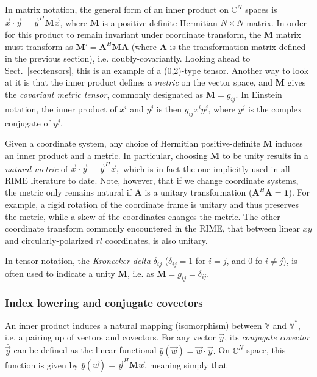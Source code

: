 \documentclass[]{aa}
\newcommand{\herm}{H}
\begin{document}
In matrix notation, the general form of an inner product on $\mathbb{C}^N$ spaces is $\vec x\cdot \vec y = \vec y^\herm \mathbf{M} \vec x$, where $\mathbf{M}$ is a positive-definite Hermitian $N\times N$ matrix. In order for this product to remain invariant under coordinate transform, the $\mathbf{M}$ matrix must transform as $\mathbf{M}'=\mathbf{A}^\herm \mathbf{M} \mathbf{A}$ (where $\mathbf{A}$ is the transformation matrix defined in the previous section), i.e. doubly-covariantly. Looking ahead to Sect.~\ref{sec:tensors}, this is an example of a (0,2)-type tensor. Another way to look at it is that the inner product defines a \emph{metric} on the vector space, and $\mathbf{M}$ gives the \emph{covariant metric tensor}, commonly designated as $\mathbf{M}=g_{ij}$. In Einstein notation, the inner product of $x^i$ and $y^j$ is then $g_{ij} x^i \overline{y^j}$, where $\overline{y^j}$ is the complex conjugate of $y^j$.

Given a coordinate system, any choice of Hermitian positive-definite $\mathbf{M}$ induces an inner product and a metric. In particular, choosing 
$\mathbf{M}$ to be unity results in a \emph{natural metric} of $\vec x \cdot \vec y=\vec y^\herm\vec x,$ which is in fact the one implicitly used in all RIME literature to date. Note, however, that if we change coordinate systems, the metric only remains natural if $\mathbf{A}$ is a unitary transformation ($\mathbf{A}^\herm \mathbf{A}=\mathbf{1}$). For example, a rigid rotation of the coordinate frame is unitary and thus preserves the metric, while a skew of the coordinates changes the metric. The other coordinate transform commonly encountered in the RIME, that between linear $xy$ and circularly-polarized $rl$ coordinates, is also unitary.

In tensor notation, the \emph{Kronecker delta} $\delta_{ij}$ ($\delta_{ij}=1$ for $i=j$, and 0 fo $i\ne j$), is often used to indicate a unity $\mathbf{M}$, i.e. as $\mathbf{M}=g_{ij}=\delta_{ij}.$

 
\subsubsection{Index lowering and conjugate covectors}
\label{sec:index-lowering}

An inner product induces a natural mapping (isomorphism) between $\mathbb{V}$ and $\mathbb{V}^*$, i.e. a pairing up of vectors and covectors.
For any vector $\vec y$, its \emph{conjugate covector} $\bar{\vec y}$ can be defined as the linear functional $\bar y(\vec w) = \vec w \cdot \vec y.$ On $\mathbb{C}^N$ space, this function is given by $\bar y(\vec w) = \vec y^\herm \mathbf{M} \vec w$, meaning simply that
\end{document}
